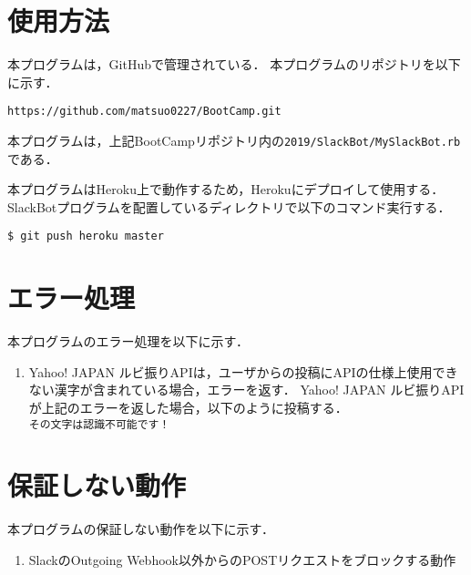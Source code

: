 \documentclass[12pt]{jsarticle}
\begin{document}
\section{使用方法}\label{sec:usage}
本プログラムは，GitHubで管理されている．
本プログラムのリポジトリを以下に示す．
\begin{verbatim}
https://github.com/matsuo0227/BootCamp.git
\end{verbatim}
本プログラムは，上記BootCampリポジトリ内の\verb|2019/SlackBot/MySlackBot.rb|である．


本プログラムはHeroku上で動作するため，Herokuにデプロイして使用する．
SlackBotプログラムを配置しているディレクトリで以下のコマンド実行する．
\begin{verbatim}
$ git push heroku master
\end{verbatim}


\section{エラー処理}\label{sec:error}
本プログラムのエラー処理を以下に示す．
\begin{enumerate}
\item Yahoo! JAPAN ルビ振りAPIは，ユーザからの投稿にAPIの仕様上使用できない漢字が含まれている場合，エラーを返す．
Yahoo! JAPAN ルビ振りAPIが上記のエラーを返した場合，以下のように投稿する．\\
\verb|その文字は認識不可能です！|
\end{enumerate}

\section{保証しない動作}
本プログラムの保証しない動作を以下に示す．
\begin{enumerate}
\item SlackのOutgoing Webhook以外からのPOSTリクエストをブロックする動作
\end{enumerate}



\end{document}
